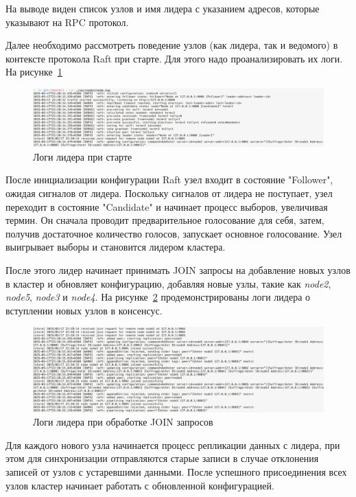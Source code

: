 На выводе виден список узлов и имя лидера с указанием адресов, которые указывают на RPC протокол.

Далее необходимо рассмотреть поведение узлов (как лидера, так и ведомого) в контексте протокола Raft при старте.
Для этого надо проанализировать их логи. На рисунке~\ref{fig:fig6}

\begin{figure}
  \centering
  \includegraphics[scale=0.28]{assets/leader_logs.png}
  \caption{Логи лидера при старте}
  \label{fig:fig6}
\end{figure}

После инициализации конфигурации Raft узел входит в состояние "Follower", ожидая сигналов от лидера. Поскольку сигналов от лидера не поступает, узел переходит
в состояние "Candidate" и начинает процесс выборов, увеличивая термин. Он сначала проводит предварительное голосование для себя, затем, получив достаточное
количество голосов, запускает основное голосование. Узел выигрывает выборы и становится лидером кластера.

После этого лидер начинает принимать JOIN запросы на добавление новых узлов в кластер и обновляет конфигурацию, добавляя новые узлы, такие как \textit{node2},
\textit{node5}, \textit{node3} и \textit{node4}. На рисунке~\ref{fig:fig7} продемонстрированы логи лидера о вступлении новых узлов в консенсус.

\begin{figure}
  \centering
  \includegraphics[scale=0.28]{assets/join_logs.png}
  \caption{Логи лидера при обработке JOIN запросов}
  \label{fig:fig7}
\end{figure}

Для каждого нового узла начинается процесс репликации данных с лидера, при этом для синхронизации отправляются старые записи в случае отклонения записей от узлов
с устаревшими данными. После успешного присоединения всех узлов кластер начинает работать с обновленной конфигурацией.

